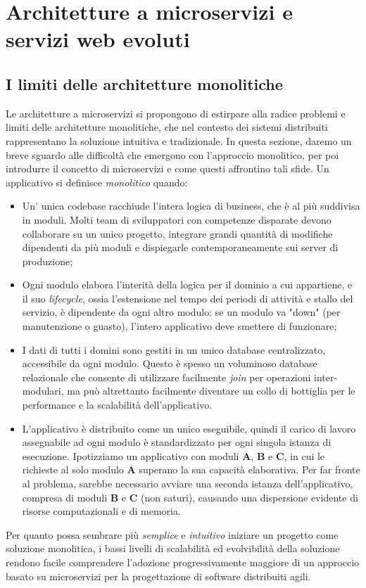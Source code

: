\chapter{Architetture a microservizi e servizi web evoluti}
\section{I limiti delle architetture monolitiche}
Le architetture a microservizi si propongono di estirpare alla radice problemi e limiti delle architetture monolitiche, che nel contesto dei sistemi distribuiti rappresentano la soluzione intuitiva e tradizionale. In questa sezione, daremo un breve sguardo alle difficoltà che emergono con l'approccio monolitico, per poi introdurre il concetto di microservizi e come questi affrontino tali sfide.
Un applicativo si definisce \emph{monolitico} quando:

\begin{itemize}
  \item Un' unica codebase racchiude l'intera logica di business, che è al più suddivisa in moduli. Molti team di sviluppatori con competenze disparate devono collaborare su un unico progetto, integrare grandi quantità di modifiche dipendenti da più moduli e dispiegarle contemporaneamente sui server di produzione;
  \item Ogni modulo elabora l'interità della logica per il dominio a cui appartiene, e il suo \emph{lifecycle}, ossia l'estensione nel tempo dei periodi di attività e stallo del servizio, è dipendente da ogni altro modulo: se un modulo va "down" (per manutenzione o guasto), l'intero applicativo deve smettere di funzionare;
  \item I dati di tutti i domini sono gestiti in un unico database centralizzato, accessibile da ogni modulo. Questo è spesso un voluminoso database relazionale che consente di utilizzare facilmente \emph{join} per operazioni inter-modulari, ma può altrettanto facilmente diventare un collo di bottiglia per le performance e la scalabilità dell'applicativo.
  \item L'applicativo è distribuito come un unico eseguibile, quindi il carico di lavoro assegnabile ad ogni modulo è standardizzato per ogni singola istanza di esecuzione.
  Ipotizziamo un applicativo con moduli \textbf{A}, \textbf{B} e \textbf{C}, in cui le richieste al solo modulo \textbf{A} superano la sua capacità elaborativa. Per far fronte al problema, sarebbe necessario avviare una seconda istanza dell'applicativo, compresa di moduli \textbf{B} e \textbf{C} (non saturi), causando una dispersione evidente di risorse computazionali e di memoria.
\end{itemize}
Per quanto possa sembrare più \emph{semplice} e \emph{intuitivo} iniziare un progetto come soluzione monolitica, i bassi livelli di scalabilità ed evolvibilità della soluzione rendono facile comprendere l'adozione progressivamente maggiore di un approccio basato su microservizi per la progettazione di software distribuiti agili.

